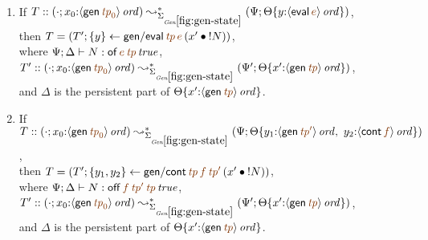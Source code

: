 \bigskip
\begin{lemma}~
\begin{enumerate}
\item If 
   $T :: (\cdot; x_0{:}\istrue{\susp{{\sf gen}\,\lf{{\it tp}_0}}})
         \leadsto^*_{\siggenstate}
         (\Psi; \tackon{\Theta}
            {y{:}\istrue{\susp{{\sf eval}\,\lf{e}}}})$,
\\ then 
   $T = \left(T'; \trstep{y}{{\sf gen/eval}\,\lf{{\it tp}}\,\lf{e}\,
                                  (\tfuser{x'}{\tbangr{N}})}\right)$,
\\ where
   $\Psi; \Delta \vdash N : \isconc{{{\sf of}\,\lf{e}\,\lf{{\it tp}}}}$,
\\ $T' :: (\cdot; x_0{:}\istrue{\susp{{\sf gen}\,\lf{{\it tp}_0}}})
       \leadsto^*_{\siggenstate}
       (\Psi'; \tackon{\Theta}
          {x'{:}\istrue{\susp{{\sf gen}\,\lf{{\it tp}}}}})$, 
\\ and $\Delta$ is the persistent part of 
   $\tackon{\Theta}
          {x'{:}\istrue{\susp{{\sf gen}\,\lf{{\it tp}}}}}$.
   
\medskip
\item If 
   $T :: (\cdot; x_0{:}\istrue{\susp{{\sf gen}\,\lf{{\it tp}_0}}})
         \leadsto^*_{\siggenstate}
         (\Psi; \tackon{\Theta}
            {y_1{:}\istrue{\susp{{\sf gen}\,\lf{{\it tp}'}}}, ~
             y_2{:}\istrue{\susp{{\sf cont}\,\lf{f}}}})$,
\\ then 
   $T = \left(T'; \trstep{y_1,y_2}
              {{\sf gen/cont}\,\lf{{\it tp}}\,\lf{f}\,\lf{{\it tp}'}\,
                (\tfuser{x'}{\tbangr{N}})}\right)$,
\\ where 
   $\Psi; \Delta \vdash N : 
       \isconc{{{{\sf off}\,\lf{f}\,\lf{{\it tp}'}\,\lf{{\it tp}}}}}$,
\\ $T' :: (\cdot; x_0{:}\istrue{\susp{{\sf gen}\,\lf{{\it tp}_0}}})
       \leadsto^*_{\siggenstate}
       (\Psi'; \tackon{\Theta}
          {x'{:}\istrue{\susp{{\sf gen}\,\lf{{\it tp}}}}})$,
\\ and $\Delta$ is the persistent part of 
   $\tackon{\Theta}
          {x'{:}\istrue{\susp{{\sf gen}\,\lf{{\it tp}}}}}$.



\end{enumerate}
\end{lemma}
